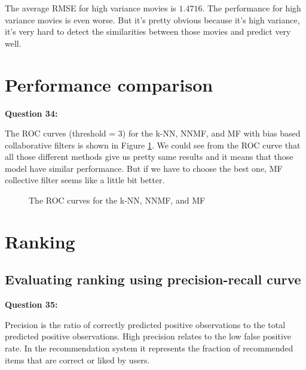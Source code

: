 \documentclass{article}
\begin{document}
The average RMSE for high variance movies is $1.4716$. The performance for high variance movies is even worse. But it's pretty obvious because it's high variance, it's very hard to detect the similarities between those movies and predict very well.


\section{Performance comparison}

\bigbreak \textbf{Question 34:}

The ROC curves (threshold = $3$) for the k-NN, NNMF, and MF with bias based collaborative filters is shown in Figure \ref{Q34}. We could see from the ROC curve that all those different methods give us pretty same results and it means that those model have similar performance. But if we have to choose the best one, MF collective filter seems like a little bit better.

\begin{figure}
\centering
{}
\caption{The ROC curves for the k-NN, NNMF, and MF} 
\label{Q34}
\end{figure}


\section{Ranking}

\subsection{Evaluating ranking using precision-recall curve}

\bigbreak \textbf{Question 35:}

Precision is the ratio of correctly predicted positive observations to the total predicted positive observations. High precision relates to the low false positive rate. In the recommendation system it represents the fraction of recommended items that are correct or liked by users.
\end{document}
